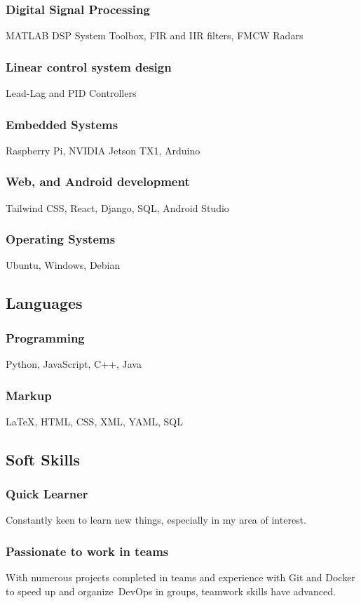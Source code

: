 \documentclass[a4paper]{article}
\begin{document}
        \subsubsection{Digital Signal Processing}
        MATLAB DSP System Toolbox, FIR and IIR filters, FMCW Radars
        \subsubsection{Linear control system design}
        Lead-Lag and PID Controllers
        \subsubsection{Embedded Systems}
        Raspberry Pi, NVIDIA Jetson TX1, Arduino
        \subsubsection{Web, and Android  development}
        Tailwind CSS, React, Django, SQL, Android Studio
        \subsubsection{Operating Systems}
        Ubuntu, Windows, Debian
        \subsection{Languages}
        \subsubsection{Programming}
        Python, JavaScript, C++, Java
        \subsubsection{Markup}
        {\LaTeX}, HTML, CSS, XML, YAML, SQL
        \subsection{Soft Skills}
        \subsubsection{Quick Learner}
        Constantly keen to learn new things, especially in my area of interest.
        \subsubsection{Passionate to work in teams}
        With numerous projects completed in teams and experience with Git and Docker to speed up and organize DevOps in groups, teamwork skills have advanced.
\end{document}
